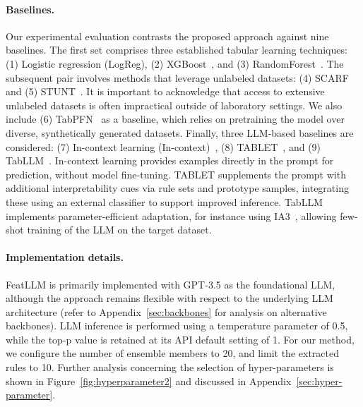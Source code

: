 \vspace*{-0.12in}
\paragraph{Baselines.}
Our experimental evaluation contrasts the proposed approach against nine baselines. The first set comprises three established tabular learning techniques: (1) Logistic regression (LogReg), (2) XGBoost~\cite{chen2016xgboost}, and (3) RandomForest~\cite{ho1995random}. The subsequent pair involves methods that leverage unlabeled datasets: (4) SCARF~\cite{bahri2022scarf} and (5) STUNT~\cite{nam2023stunt}. It is important to acknowledge that access to extensive unlabeled datasets is often impractical outside of laboratory settings. We also include (6) TabPFN~\cite{hollmann2022tabpfn} as a baseline, which relies on pretraining the model over diverse, synthetically generated datasets. Finally, three LLM-based baselines are considered: (7) In-context learning (In-context)~\cite{wei2022emergent}, (8) TABLET~\cite{slack2023tablet}, and (9) TabLLM~\cite{hegselmann2023tabllm}. In-context learning provides examples directly in the prompt for prediction, without model fine-tuning. TABLET supplements the prompt with additional interpretability cues via rule sets and prototype samples, integrating these using an external classifier to support improved inference. TabLLM implements parameter-efficient adaptation, for instance using IA3~\cite{liu2022few}, allowing few-shot training of the LLM on the target dataset.

\vspace*{-0.12in}
\paragraph{Implementation details.}
\textsf{FeatLLM} is primarily implemented with GPT-3.5 as the foundational LLM, although the approach remains flexible with respect to the underlying LLM architecture (refer to Appendix~\ref{sec:backbones} for analysis on alternative backbones). LLM inference is performed using a temperature parameter of 0.5, while the top-p value is retained at its API default setting of 1. For our method, we configure the number of ensemble members to 20, and limit the extracted rules to 10. Further analysis concerning the selection of hyper-parameters is shown in Figure~\ref{fig:hyperparameter2} and discussed in Appendix~\ref{sec:hyper-parameter}.

